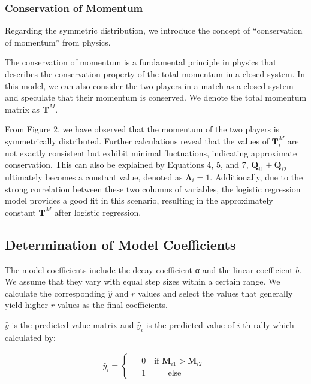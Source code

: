 \documentclass{mcmthesis}
\begin{document}
\subsubsection{Conservation of Momentum}
Regarding the symmetric distribution, we introduce the concept of ``conservation of momentum'' from physics.

The conservation of momentum is a fundamental principle in physics that describes the conservation property of the total momentum in a closed system. In this model, we can also consider the two players in a match as a closed system and speculate that their momentum is conserved. We denote the total momentum matrix as $\mathbf{T}^M$.

From Figure 2, we have observed that the momentum of the two players is symmetrically distributed. Further calculations reveal that the values of $\mathbf{T}^M_i$ are not exactly consistent but exhibit minimal fluctuations, indicating approximate conservation. This can also be explained by Equations 4, 5, and 7, $\mathbf{Q}_{i1} + \mathbf{Q}_{i2}$ ultimately becomes a constant value, denoted as $\mathbf{\Lambda}_i=1$. Additionally, due to the strong correlation between these two columns of variables, the logistic regression model provides a good fit in this scenario, resulting in the approximately constant $\mathbf{T}^M$ after logistic regression.
\subsection{Determination of Model Coefficients}
The model coefficients include the decay coefficient α and the linear coefficient $b$. We assume that they vary with equal step sizes within a certain range. We calculate the corresponding $\hat{y} $ and $r$ values and select the values that generally yield higher $r$ values as the final coefficients.

$\hat{y}$ is the predicted value matrix and $\hat{y}_i$ is the predicted value of $i$-th rally which calculated by:

\begin{align*}
	\hat{y}_i = \begin{cases}
		\begin{aligned}
			&0 \quad \text{if } \mathbf{M}_{i1} > \mathbf{M}_{i2} \\
			&1 \quad \;\;\;\;\;\;\text{else}
		\end{aligned}
	\end{cases}\tag{$7$}
\end{align*}
\end{document}
